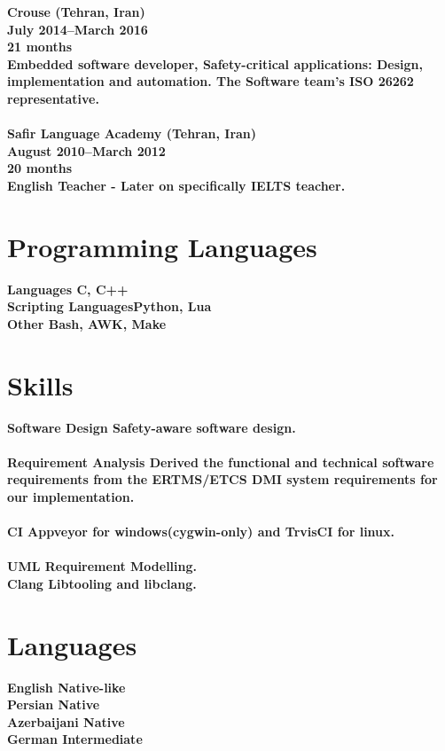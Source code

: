 \documentclass[8pt]{article}
\begin{document}
\begin{multicols}{2}
  \bf Crouse (Tehran, Iran)\\
  July 2014--March 2016\\
  21 months\\
  \normalfont Embedded software developer, Safety-critical applications: Design, implementation and automation. The Software team’s ISO 26262 representative.\\[5pt]
  \\
  \bf Safir Language Academy (Tehran, Iran)\\
  August 2010--March 2012\\
  20 months\\
  \normalfont English Teacher - Later on specifically IELTS teacher.\\[5pt]


  \section*{Programming Languages}
  \bf Languages \normalfont C, C++\\[5pt]
  \bf Scripting \normalfont LanguagesPython, Lua\\[5pt]
  \bf Other \normalfont Bash, AWK, Make\\[5pt]

  \section*{Skills}
  \bf Software Design \normalfont Safety-aware software design.\\[5pt]
  \\
  \bf Requirement Analysis \normalfont{} Derived the functional and technical software requirements from the ERTMS/ETCS DMI system requirements for our implementation.\\[5pt]
  \\
  \bf CI \normalfont Appveyor for windows(cygwin-only) and TrvisCI for linux.\\[5pt]
  \\
  \bf UML \normalfont Requirement Modelling.\\[5pt]
  \bf Clang \normalfont Libtooling and libclang.\\[5pt]

  \section*{Languages}
  \bf English {\normalfont Native-like}\\
  \bf Persian {\normalfont Native}\\
  \bf Azerbaijani {\normalfont Native}\\
  \normalfont German Intermediate\\


\end{multicols}
\end{document}
